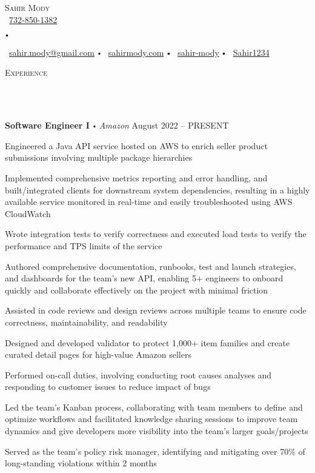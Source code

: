 \documentclass{article}
\newcommand{\contact}[3]{
\vspace*{3pt}
\begin{center}
{\Huge \scshape {#1}}\\
\vspace{0pt}
#2 
\vspace{0pt}
#3
\end{center}
\vspace*{-3pt}
}
\newcommand{\header}[1]{{
\hspace*{-15pt}\vspace*{10pt} \large \scshape{#1}} \vspace*{-6pt} 
\lineunder
}
\newcommand{\lineunder}{
\vspace*{-8pt} \\ \hspace*{-18pt} 
\hrulefill \\
}
\newcommand{\employer}[4]{
\textbf{#1} \labelitemi \textit{#2} \hfill #3 \\ #4 \vspace*{3pt}
}
\renewcommand{\labelitemi}{
$\vcenter{\hbox{\tiny$\bullet$}}$\hspace*{3pt}
}
\renewcommand{\labelitemii}{
$\vcenter{\hbox{\tiny$\bullet$}}$\hspace*{-3pt}
}
\newenvironment{bullet-list-minor}{
\begin{list}{\labelitemii}{\setlength\leftmargin{15pt} 
\topsep 0pt \itemsep 1pt}}{\vspace*{4pt}\end{list}
}
\begin{document}
\small
\vspace*{-64pt}

\contact{Sahir Mody}\bigskip
{\faPhone\
\href{tel:7328501382}{732-850-1382}
\labelitemi
\faEnvelope\  \href{mailto:sahir.modyatgmail.com}{sahir.mody@gmail.com} \labelitemi \faInfoCircle\  \href{https://sahirmody.com}{sahirmody.com} \labelitemi \faLinkedinSquare\  \href{https://www.linkedin.com/in/sahir-mody}{sahir-mody}  \labelitemi \faGithub\  \href{https://www.github.com/Sahir1234}{Sahir1234}}

\medskip


\header{Experience}
    \vspace{4pt}
    \employer{Software Engineer I}{Amazon}{August 2022 -- PRESENT}{}
	\begin{bullet-list-minor}
        \item Engineered a Java API service hosted on AWS to enrich seller product submissions involving multiple package hierarchies
        \item Implemented comprehensive metrics reporting and error handling, and built/integrated clients for downstream system dependencies, resulting in a highly available service monitored in real-time and easily troubleshooted using AWS CloudWatch
        \item Wrote integration tests to verify correctness and executed load tests to verify the performance and TPS limits of the service
        \item Authored comprehensive documentation, runbooks, test and launch strategies, and dashboards for the team's new API, enabling 5+ engineers to onboard quickly and collaborate effectively on the project with minimal friction
        \item Assisted in code reviews and design reviews across multiple teams to ensure code correctness, maintainability, and readability
        \item Designed and developed validator to protect 1,000+ item families and create curated detail pages for high-value Amazon sellers
        \item Performed on-call duties, involving conducting root causes analyses and responding to customer issues to reduce impact of bugs
        \item Led the team's Kanban process, collaborating with team members to define and optimize workflows and facilitated knowledge sharing sessions to improve team dynamics and give developers more visibility into the team's larger goals/projects
        \item Served as the team's policy risk manager, identifying and mitigating over 70\% of long-standing violations within 2 months
    \end{bullet-list-minor}
    \medskip
    
\end{document}
